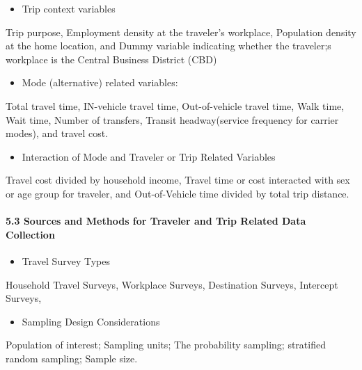 \documentclass[
]{article}
\providecommand{\tightlist}{%
  \setlength{\itemsep}{0pt}\setlength{\parskip}{0pt}}
\begin{document}
\begin{itemize}
\tightlist
\item
  Trip context variables
\end{itemize}

Trip purpose, Employment density at the traveler's workplace, Population
density at the home location, and Dummy variable indicating whether the
traveler;s workplace is the Central Business District (CBD)

\begin{itemize}
\tightlist
\item
  Mode (alternative) related variables:
\end{itemize}

Total travel time, IN-vehicle travel time, Out-of-vehicle travel time,
Walk time, Wait time, Number of transfers, Transit headway(service
frequency for carrier modes), and travel cost.

\begin{itemize}
\tightlist
\item
  Interaction of Mode and Traveler or Trip Related Variables
\end{itemize}

Travel cost divided by household income, Travel time or cost interacted
with sex or age group for traveler, and Out-of-Vehicle time divided by
total trip distance.

\hypertarget{sources-and-methods-for-traveler-and-trip-related-data-collection}{%
\paragraph{5.3 Sources and Methods for Traveler and Trip Related Data
Collection}\label{sources-and-methods-for-traveler-and-trip-related-data-collection}}

\begin{itemize}
\tightlist
\item
  Travel Survey Types
\end{itemize}

Household Travel Surveys, Workplace Surveys, Destination Surveys,
Intercept Surveys,

\begin{itemize}
\tightlist
\item
  Sampling Design Considerations
\end{itemize}

Population of interest; Sampling units; The probability sampling;
stratified random sampling; Sample size.
\end{document}
